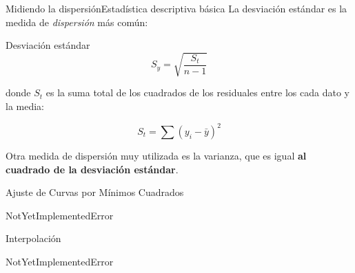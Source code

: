 \documentclass[spanish, c]{beamer}
\begin{document}
\begin{frame}{Midiendo la dispersión}{Estadística descriptiva básica}
    La \alert{desviación estándar} es la medida de \textit{dispersión} más común:

    \begin{block}{Desviación estándar}
        $$S_y = \sqrt{\frac{S_t}{n-1}}$$
    \end{block}

    donde $S_t$ es la \alert{suma total de los cuadrados de los residuales} entre los cada dato y la media:

    $$S_t = \sum (y_i - \bar{y})^2$$

    Otra medida de dispersión muy utilizada es la \alert{varianza}, que es igual \textbf{al cuadrado de la desviación estándar}.
\end{frame}

\begin{frame}{Ajuste de Curvas por Mínimos Cuadrados}
\begin{center}
    \Huge NotYetImplementedError
\end{center}
\end{frame}

\begin{frame}{Interpolación}
    \begin{center}
        \Huge NotYetImplementedError
    \end{center}
    \end{frame}





\end{document}
